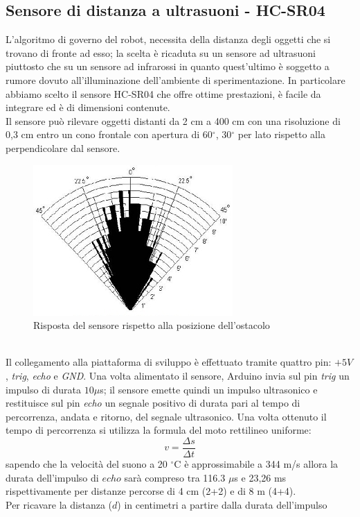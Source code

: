 \subsection{Sensore di distanza a ultrasuoni - HC-SR04}
L'algoritmo di governo del robot, necessita della distanza degli oggetti che si 
trovano di fronte ad esso; la scelta è ricaduta su un sensore 
ad ultrasuoni piuttosto che su un sensore ad infrarossi in quanto quest'ultimo è
soggetto a rumore dovuto all'illuminazione dell'ambiente di sperimentazione.
In particolare abbiamo scelto il sensore HC-SR04 che 
offre ottime prestazioni, è facile da integrare ed è di dimensioni contenute.\\
Il sensore può rilevare oggetti distanti da 2 cm a 400 cm con una risoluzione 
di 0,3 cm entro un cono frontale con apertura di 60$^\circ$, 30$^\circ$ per lato 
rispetto alla perpendicolare dal sensore.
\begin{figure}[!htb] \center
\includegraphics[scale=0.6]{immagini/HC-SR04_Angle.png}
\caption{Risposta del sensore rispetto alla posizione dell'ostacolo} 
\end{figure}
\\Il collegamento alla piattaforma di sviluppo è effettuato tramite quattro pin: 
\textit{$+5V$}, \textit{trig}, \textit{echo} e \textit{GND}.
Una volta alimentato il sensore, Arduino invia
sul pin \textit{trig} un impulso di durata $10 \mu$s; il sensore emette 
quindi un impulso ultrasonico e restituisce sul pin \textit{echo} un segnale 
positivo di durata pari al tempo di percorrenza, andata e ritorno, del segnale 
ultrasonico. Una volta ottenuto il tempo di percorrenza si utilizza la formula 
del moto rettilineo uniforme:
$$v = \frac{\Delta s}{\Delta t}$$
sapendo che la velocità del suono a 20 $^\circ$C è approssimabile a 344 m/s allora 
la durata dell'impulso di $echo$ sarà compreso tra 116.3 $\mu$s e 23,26 ms 
rispettivamente per distanze percorse di 4 cm (2+2) e di 8 m (4+4).
\\Per ricavare la distanza ($d$) in centimetri a partire dalla durata dell'impulso 
